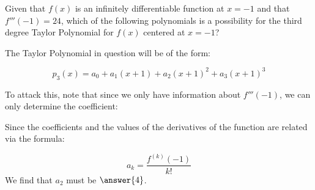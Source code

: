 \documentclass{ximera}
\author{Jim Talamo}
\begin{document}
\begin{exercise}
Given that $f(x)$ is an infinitely differentiable function at $x=-1$ and that $f'''(-1) =24$, which of the following polynomials is a possibility for the third degree Taylor Polynomial for $f(x)$ centered at $x=-1$?

\begin{selectAll}
\end{selectAll}

\begin{hint}
The Taylor Polynomial in question will be of the form:

\[
p_3(x) = a_0+a_1(x+1)+a_2(x+1)^2+a_3(x+1)^3
\]

To attack this, note that since we only have information about $f'''(-1)$, we can only determine the coefficient:

\begin{multipleChoice}
\end{multipleChoice}
\end{hint}

Since the coefficients and the values of the derivatives of the function are related via the formula:

\[
a_k = \frac{f^{(k)}(-1)}{k!}
\]
We find that $a_2$ must be $\answer{4}$.  
\end{exercise}
\end{document}
